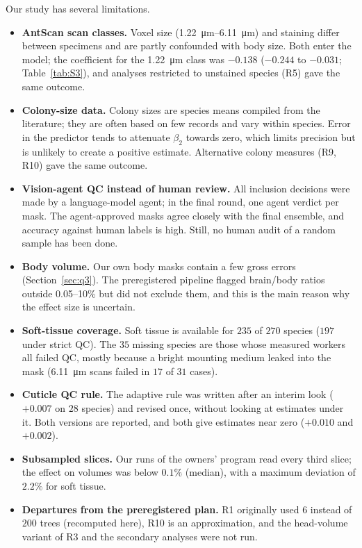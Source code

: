 \documentclass[11pt]{article}
\begin{document}
Our study has several limitations.
\begin{itemize}
\item \textbf{AntScan scan classes.} Voxel size (\qtyrange{1.22}{6.11}{\um}) and staining differ between specimens
and are partly confounded with body size. Both enter the model; the coefficient for the \qty{1.22}{\um} class was
$-0.138$ ($-0.244$ to $-0.031$; Table~\ref{tab:S3}), and analyses restricted to unstained species (R5) gave the same
outcome.
\item \textbf{Colony-size data.} Colony sizes are species means compiled from the literature; they are often based on
few records and vary within species. Error in the predictor tends to attenuate $\beta_2$ towards zero, which limits
precision but is unlikely to create a positive estimate. Alternative colony measures (R9, R10) gave the same outcome.
\item \textbf{Vision-agent QC instead of human review.} All inclusion decisions were made by a language-model agent; in
the final round, one agent verdict per mask. The agent-approved masks agree closely with the final ensemble, and
accuracy against human labels is high. Still, no human audit of a random sample has been done.
\item \textbf{Body volume.} Our own body masks contain a few gross errors (Section~\ref{sec:q3}). The preregistered
pipeline flagged brain/body ratios outside 0.05--10\% but did not exclude them, and this is the main reason why the
effect size is uncertain.
\item \textbf{Soft-tissue coverage.} Soft tissue is available for $235$ of $270$ species ($197$ under strict QC). The
$35$ missing species are those whose measured workers all failed QC, mostly because a bright mounting medium leaked
into the mask (\qty{6.11}{\um} scans failed in $17$ of $31$ cases).
\item \textbf{Cuticle QC rule.} The adaptive rule was written after an interim look ($+0.007$ on $28$ species) and
revised once, without looking at estimates under it. Both versions are reported, and both give estimates near zero
($+0.010$ and $+0.002$).
\item \textbf{Subsampled slices.} Our runs of the owners' program read every third slice; the effect on volumes was
below $0.1\%$ (median), with a maximum deviation of $2.2\%$ for soft tissue.
\item \textbf{Departures from the preregistered plan.} R1 originally used $6$ instead of $200$ trees (recomputed here),
R10 is an approximation, and the head-volume variant of R3 and the secondary analyses were not run.
\end{itemize}
\end{document}
